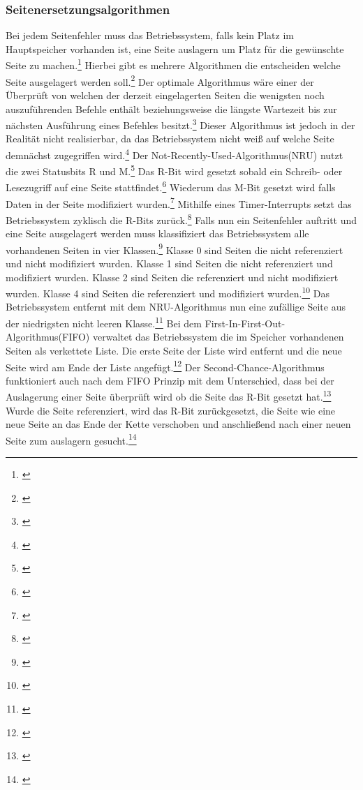 \subsubsection{Seitenersetzungsalgorithmen}
Bei jedem Seitenfehler muss das Betriebssystem, falls kein Platz im Hauptspeicher vorhanden ist, eine Seite auslagern um Platz für die gewünschte Seite zu machen.\footnote{\cite[S.~267]{Tanenbaum.2016}} Hierbei gibt es mehrere Algorithmen die entscheiden welche Seite ausgelagert werden soll.\footnote{\cite[S.~267]{Tanenbaum.2016}} Der optimale Algorithmus wäre einer der Überprüft von welchen der derzeit eingelagerten Seiten die wenigsten noch auszuführenden Befehle enthält beziehungsweise die längste Wartezeit bis zur nächsten Ausführung eines Befehles besitzt.\footnote{\cite[S.~268]{Tanenbaum.2016}}  Dieser Algorithmus ist jedoch in der Realität nicht realisierbar, da das Betriebssystem nicht weiß auf welche Seite demnächst zugegriffen wird.\footnote{\cite[S.~268]{Tanenbaum.2016}}
Der Not-Recently-Used-Algorithmus(NRU) nutzt die zwei Statusbits R und M.\footnote{\cite[S.~269]{Tanenbaum.2016}} Das R-Bit wird gesetzt sobald ein Schreib- oder Lesezugriff auf eine Seite stattfindet.\footnote{\cite[S.~269]{Tanenbaum.2016}}  Wiederum das M-Bit gesetzt wird falls Daten in der Seite modifiziert wurden.\footnote{\cite[S.~269]{Tanenbaum.2016}} Mithilfe eines Timer-Interrupts setzt das Betriebssystem zyklisch die R-Bits zurück.\footnote{\cite[S.~269]{Tanenbaum.2016}} Falls nun ein Seitenfehler auftritt und eine Seite ausgelagert werden muss klassifiziert das Betriebssystem alle vorhandenen Seiten in vier Klassen.\footnote{\cite[S.~270]{Tanenbaum.2016}}  Klasse 0 sind Seiten die nicht referenziert und nicht modifiziert wurden. Klasse 1 sind Seiten die nicht referenziert und modifiziert wurden. Klasse 2 sind Seiten die referenziert und nicht modifiziert wurden. Klasse 4 sind Seiten die referenziert und modifiziert wurden.\footnote{\cite[S.~270]{Tanenbaum.2016}} Das Betriebssystem entfernt mit dem NRU-Algorithmus nun eine zufällige Seite aus der niedrigsten nicht leeren Klasse.\footnote{\cite[S.~270]{Tanenbaum.2016}}
Bei dem First-In-First-Out-Algorithmus(FIFO) verwaltet das Betriebssystem die im Speicher vorhandenen Seiten als verkettete Liste. Die erste Seite der Liste wird entfernt und die neue Seite wird am Ende der Liste angefügt.\footnote{\cite[S.~270]{Tanenbaum.2016}}
Der Second-Chance-Algorithmus funktioniert auch nach dem FIFO Prinzip mit dem Unterschied, dass bei der Auslagerung einer Seite überprüft wird ob die Seite das R-Bit gesetzt hat.\footnote{\cite[S.~271]{Tanenbaum.2016}} Wurde die Seite referenziert, wird das R-Bit zurückgesetzt, die Seite wie eine neue Seite an das Ende der Kette verschoben und anschließend nach einer neuen Seite zum auslagern gesucht.\footnote{\cite[S.~271]{Tanenbaum.2016}}
